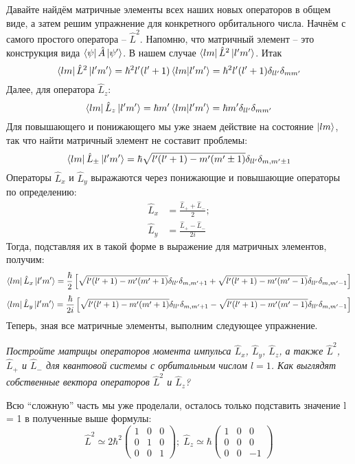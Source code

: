 Давайте найдём матричные элементы всех наших новых операторов в общем виде, а затем решим упражнение для конкретного орбитального числа. Начнём с самого простого оператора -- $\hat{L}^2$. Напомню, что матричный элемент -- это конструкция вида $\bra{\psi}\hat{A}\ket{\psi'}$. В нашем случае $\bra{lm}\hat{L}^2\ket{l'm'}$. Итак
\[
\bra{lm}\hat{L}^2\ket{l'm'} = \hbar^2l'(l'+1)\bra{lm}\ket{l'm'} = \hbar^2l'(l'+1)\delta_{ll'}\delta_{mm'}
\]
Далее, для оператора $\hat{L}_z$:
\[
\bra{lm}\hat{L}_z\ket{l'm'} = \hbar m'\bra{lm}\ket{l'm'} = \hbar m'\delta_{ll'}\delta_{mm'}
\]
Для повышающего и понижающего мы уже знаем действие на состояние $\ket{lm}$, так что найти матричный элемент не составит проблемы:
\[
    \bra{lm}\hat{L}_{\pm}\ket{l'm'} = \hbar\sqrt{l'(l'+1) - m'(m' \pm 1)}\delta_{ll'}\delta_{m,m'\pm 1}
\]
Операторы $\hat{L}_x$ и $\hat{L}_y$ выражаются через понижающие и повышающие операторы по определению:
\begin{align*}
    \hat{L}_x & = \frac{\hat{L}_+ + \hat{L}_-}{2};\\
    \hat{L}_y & = \frac{\hat{L}_+ - \hat{L}_-}{2i}
\end{align*}
Тогда, подставляя их в такой форме в выражение для матричных элементов, получим:
\[
\bra{lm}\hat{L}_{x}\ket{l'm'} = \frac{\hbar}{2}\left[\sqrt{l'(l'+1) - m'(m' + 1)}\delta_{ll'}\delta_{m,m' + 1} + \sqrt{l'(l'+1) - m'(m' - 1)}\delta_{ll'}\delta_{m,m' - 1}\right]
\]
\[
\bra{lm}\hat{L}_{y}\ket{l'm'} = \frac{\hbar}{2i}\left[\sqrt{l'(l'+1) - m'(m' + 1)}\delta_{ll'}\delta_{m,m' + 1} - \sqrt{l'(l'+1) - m'(m' - 1)}\delta_{ll'}\delta_{m,m' - 1}\right]
\]
Теперь, зная все матричные элементы, выполним следующее упражнение.
\begin{center}
    \textit{Постройте матрицы операторов момента импульса $\hat{L}_x$, $\hat{L}_y$, $\hat{L}_z$, а также $\hat{L}^2$, $\hat{L}_+$ и $\hat{L}_-$ для квантовой системы с орбитальным числом $l = 1$. Как выглядят собственные вектора операторов $\hat{L}^2$ и $\hat{L}_z$?}
\end{center}
Всю ``сложную'' часть мы уже проделали, осталось только подставить значение l = 1 в полученные выше формулы:
\[
\hat{L}^2 \simeq  2\hbar^2 \left(\begin{array}{ccc} 1 & 0 & 0 \\ 0 & 1 & 0 \\ 0 & 0 & 1 \end{array} \right); \; \hat{L}_z \simeq  \hbar \left(\begin{array}{ccc} 1 & 0 & 0 \\ 0 & 0 & 0 \\ 0 & 0 & -1 \end{array} \right)
\]
